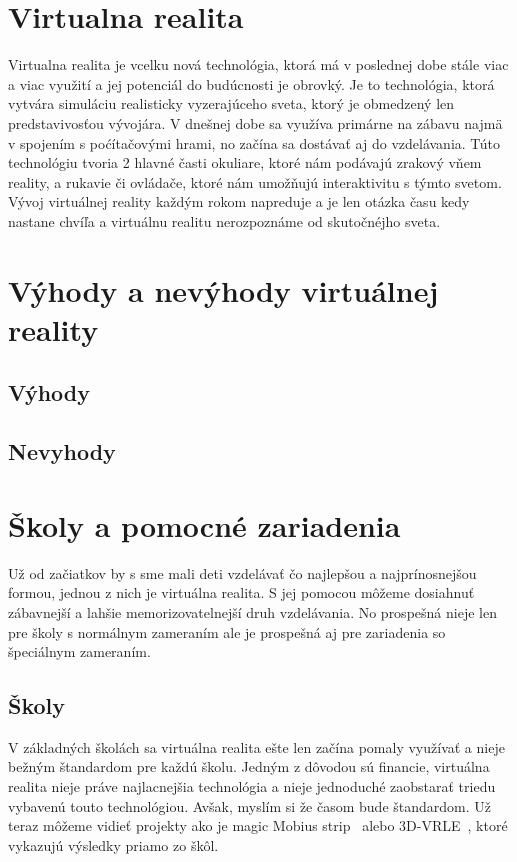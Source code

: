 \documentclass[10pt,twoside,slovak,a4paper]{article}
\begin{document}
\section{Virtualna realita} \label{realita}
Virtualna realita je vcelku nová technológia, ktorá má v poslednej dobe stále viac a viac využití a jej potenciál do budúcnosti je obrovký. Je to technológia, ktorá vytvára simuláciu realisticky vyzerajúceho sveta, ktorý je obmedzený len predstavivosťou vývojára. V dnešnej dobe sa využíva primárne na zábavu najmä v spojením s poćítačovými hrami, no začína sa dostávať aj do vzdelávania. Túto technológiu tvoria 2 hlavné časti okuliare, ktoré nám podávajú zrakový vňem reality, a rukavie či ovládače, ktoré nám umožňujú interaktivitu s týmto svetom. Vývoj virtuálnej reality každým rokom napreduje a je len otázka času kedy nastane chvíľa a virtuálnu realitu nerozpoznáme od skutočnéjho sveta.~\cite{VR}  

\section{Výhody a nevýhody virtuálnej reality} \label{procon}


\subsection{Výhody} \label{procon:vyhody}



\subsection{Nevyhody} \label{procon:nevyhody}


\section{Školy a pomocné zariadenia} \label{školy}
Už od začiatkov by s sme mali deti vzdelávať čo najlepšou a najprínosnejšou formou, jednou z nich je virtuálna realita. S jej pomocou môžeme dosiahnuť zábavnejší a lahšie memorizovatelnejší druh vzdelávania. No prospešná nieje len pre školy s normálnym zameraním ale je prospešná aj pre zariadenia so špeciálnym zameraním. 

\subsection{Školy} \label{školy:školy}
V základných školách sa virtuálna realita ešte len začína pomaly využívať a nieje bežným štandardom pre každú školu. Jedným z dôvodou sú financie, virtuálna realita nieje práve najlacnejšia technológia a nieje jednoduché zaobstarať triedu vybavenú touto technológiou. Avšak, myslím si že časom bude štandardom. Už teraz môžeme vidieť projekty ako je magic Mobius strip~\cite{Math} alebo 3D-VRLE~\cite{Physics}, ktoré vykazujú výsledky priamo zo škôl. 
\end{document}
